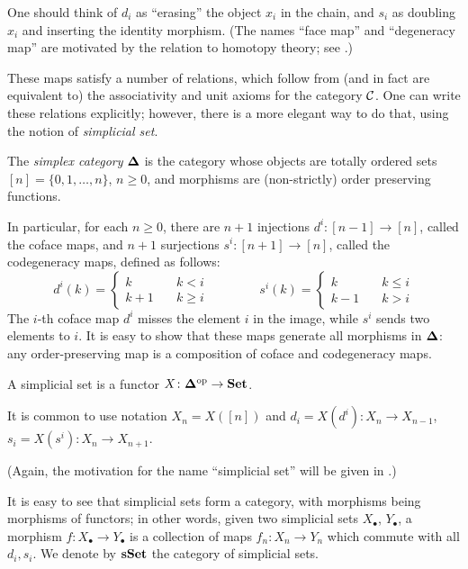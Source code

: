 One should think of $d_i$ as ``erasing'' the object $x_i$ in the chain, and $s_i$
as doubling $x_i$ and inserting the identity morphism. (The names ``face map''
and ``degeneracy map'' are motivated by the relation to homotopy theory; see
.)

These maps satisfy a number of relations, which follow from (and in fact are
equivalent to) the associativity and unit axioms for the category $\mathcal{C}$. One can write
these relations explicitly; however, there is a more elegant way to do that,
using the notion of \emph{simplicial set}.

\begin{definition}\label{d:simplex-category}
The \emph{simplex category} $\mathbf{\Delta}$ is the category whose objects are
totally ordered sets $[n] = \{0,1,\dots,n\}$, $n \ge 0$, and morphisms are
(non-strictly) order preserving functions.
\end{definition}
In particular, for each $n\ge 0$, there are $n + 1$ injections
$d^i\colon [n-1] \to [n]$, called the coface maps, and
$n + 1$ surjections $s^i \colon [n + 1] \to [n]$,
called the codegeneracy maps, defined as follows:
$$
d^i(k) = \begin{cases}
            k & \quad k<i\\
            k+1 & \quad k\ge i
          \end{cases}
\qquad \qquad
s^i(k) = \begin{cases}
            k & \quad k\le i\\
            k-1 & \quad k> i
          \end{cases}
$$
The $i$-th coface map $d^i$ misses the element $i$ in the image, while $s^i$
sends two elements to $i$. It is easy to show that these maps generate all
morphisms in $\mathbf{\Delta}$: any order-preserving map is a composition of coface and
codegeneracy maps.

\begin{definition}\label{d:simplicial-set}
  A simplicial set is a functor $X\colon \mathbf{\Delta}^{\mathrm{op}}\to \mathbf{Set}$.
\end{definition}
It is common to use notation $X_n=X([n])$ and $d_i=X(d^i)\colon X_{n}\to
X_{n-1}$, $s_i = X(s^i)\colon X_n\to X_{n+1}$.

(Again, the motivation for the name ``simplicial set'' will be given in
.)

It is easy to see that simplicial sets form a category, with morphisms being
morphisms of functors; in other words, given two simplicial sets $X_\bullet$,
$Y_\bullet$, a morphism $f\colon X_\bullet \to Y_\bullet$ is a collection of
maps $f_n\colon X_n\to Y_n$ which commute with all $d_i, s_i$. We denote by
$\mathbf{sSet}$ the category of simplicial sets.

